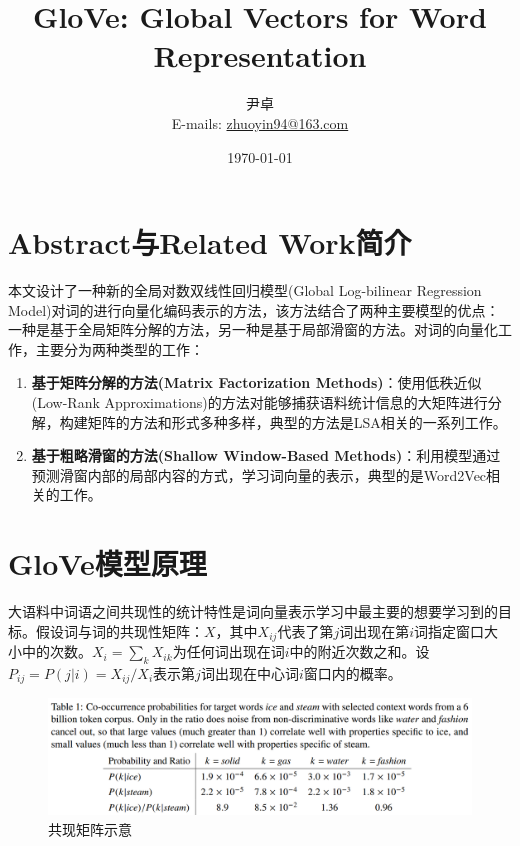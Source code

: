 \documentclass[UTF8, 12pt]{ctexart}
\begin{document}
	
	\title{\heiti \Huge{GloVe: Global Vectors for Word Representation}}
	\author{\kaishu 尹卓 \\ E-mails: \href{mailto:zhuoyin94@163.com}{zhuoyin94@163.com}}
	\date{\today}
	\maketitle
	
	\tableofcontents
	\newpage
	\section{Abstract与Related Work简介}
	本文\cite{pennington2014glove}设计了一种新的全局对数双线性回归模型(Global Log-bilinear Regression Model)对词的进行向量化编码表示的方法，该方法结合了两种主要模型的优点：一种是基于全局矩阵分解的方法，另一种是基于局部滑窗的方法。对词的向量化工作，主要分为两种类型的工作：
	\begin{enumerate}
		\item \textbf{基于矩阵分解的方法(Matrix Factorization Methods)}：使用低秩近似(Low-Rank Approximations)的方法对能够捕获语料统计信息的大矩阵进行分解，构建矩阵的方法和形式多种多样，典型的方法是LSA相关的一系列工作。
		\item \textbf{基于粗略滑窗的方法(Shallow Window-Based Methods)}：利用模型通过预测滑窗内部的局部内容的方式，学习词向量的表示，典型的是Word2Vec相关的工作。
	\end{enumerate}

	\section{GloVe模型原理}
	大语料中词语之间共现性的统计特性是词向量表示学习中最主要的想要学习到的目标。假设词与词的共现性矩阵：$X$，其中$X_{ij}$代表了第$j$词出现在第$i$词指定窗口大小中的次数。$X_{i} = \sum_{k}X_{ik}$为任何词出现在词$i$中的附近次数之和。设$P_{ij} = P(j|i) = X_{ij}/X_{i}$表示第$j$词出现在中心词$i$窗口内的概率。

	\begin{figure}[H]
		\centering
		\includegraphics[width=0.85\linewidth]{..//Plots//table_1.png}
		\caption{共现矩阵示意}
		\label{tab_1}
		\vspace{-0.5em}
	\end{figure}
\end{document}
